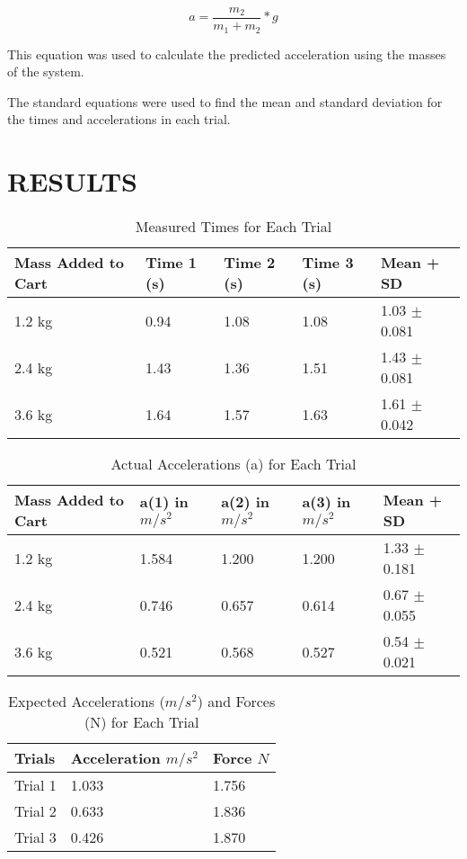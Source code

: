 \documentclass[twocolumn, 10pt]{article}
\begin{document}
\begin{equation} \label{eq:5}
    a = \frac{m_2}{m_1+m_2} * g
\end{equation}

This equation was used to calculate the predicted acceleration using the masses of the system. \cite{ref2} 
\newline \indent

The standard equations were used to find the mean and standard deviation for the times and accelerations in each trial.

\section*{RESULTS}


\begin{table}[H]
\centering
\begin{tabular}{ | m{1.2cm} | m{1.1cm}| m{1.1cm} | m{1.1cm} | m{1cm} |} 
  \hline
  Mass Added to Cart & Time 1 (s) & Time 2 (s) & Time 3 (s) & Mean + SD \\ 
  \hline
  1.2 kg& 0.94 & 1.08 & 1.08 & 1.03 $\pm$ 0.081\\ 
  \hline
  2.4 kg& 1.43 & 1.36 & 1.51 & 1.43 $\pm$ 0.081 \\ 
  \hline
  3.6 kg& 1.64 & 1.57 & 1.63 & 1.61 $\pm$ 0.042 \\ 
  \hline
\end{tabular}
\caption{Measured Times for Each Trial} 
    \label{Times of Trials} 
\end{table}

\begin{table}[H] 
\centering
\begin{tabular}{ | m{1.2cm} | m{1.2cm}| m{1.2cm} | m{1.2cm} | m{1cm} |} 
  \hline
  Mass Added to Cart & a(1) in $m/s^2$ & a(2) in $m/s^2$ & a(3) in $m/s^2$ & Mean + SD  \\ 
  \hline
  1.2 kg& 1.584 & 1.200  & 1.200 & 1.33 $\pm$ 0.181\\ 
  \hline
  2.4 kg& 0.746 & 0.657 & 0.614 & 0.67 $\pm$ 0.055 \\ 
  \hline
  3.6 kg& 0.521 & 0.568 & 0.527 & 0.54 $\pm$ 0.021 \\ 
  \hline
\end{tabular}
\caption{Actual Accelerations (a) for Each Trial}
    \label{Accelerations for Each Trial} 
\end{table}

\begin{table}[H] 
\centering
\begin{tabular}{ | m{1.2cm} | m{2.1cm}| m{1.2cm}|} 
  \hline
  Trials & Acceleration $m/s^2$ & Force $N$ \\ 
  \hline
  Trial 1 & 1.033 & 1.756\\ 
  \hline
  Trial 2 & 0.633 & 1.836 \\ 
  \hline
  Trial 3 & 0.426 & 1.870 \\ 
  \hline
\end{tabular}
\caption{ Expected Accelerations ($m/s^2$) and Forces (N) for Each Trial}
    \label{Accelerations for Each Trial} 
\end{table}
\end{document}

